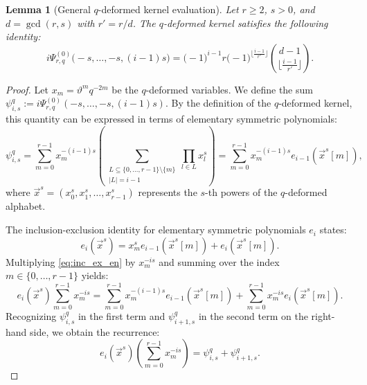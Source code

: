 \documentclass[reqno,11pt]{amsart}
\theoremstyle{plain}
\newtheorem{lemma}[theorem]{Lemma}
\theoremstyle{definition}
\theoremstyle{remark}
\numberwithin{equation}{section}
\renewcommand{\theta}{\vartheta}
\newcommand{\1}{\mathds{1}}
\newcommand{\2}{\frac{1}{2}}
\begin{document}
{				\begin{lemma}[General $q$-deformed kernel evaluation]\label{l:Aq4_q}
					{Let $r \geq 2$, $s > 0$, and $d = \gcd(r, s)$ with $r' = r/d$. The $q$-deformed kernel satisfies the following identity:
						\begin{equation}
							i \Psi^{(0)}_{r,q}\big(-s, \dots, -s, (i-1)s\big) = \big(-1\big)^{i-1} r \big(-1\big)^{\lfloor \frac{i-1}{r'} \rfloor} \binom{d-1}{\lfloor \frac{i-1}{r'} \rfloor}.
					\end{equation}}
				\end{lemma}
				\begin{proof}
					{Let $x_m = \theta^m q^{-2m}$ be the $q$-deformed  variables. We define the sum $\psi_{i,s}^q := i \Psi^{(0)}_{r,q}(-s, \dots, -s, (i-1)s)$. By the definition of the $q$-deformed kernel, this quantity can be expressed in terms of elementary symmetric polynomials:
						\begin{equation}
							\psi_{i,s}^q = \sum_{m=0}^{r-1} x_m^{-(i-1)s} \left( \sum_{\substack{L \subseteq \{0, \dots, r-1\} \setminus \{m\} \\ |L|=i-1}} \prod_{l \in L} x_l^s \right) = \sum_{m=0}^{r-1} x_m^{-(i-1)s} e_{i-1}(\vec{{x}}^s[m]),
						\end{equation}
						where $\vec{{x}}^s = (x_0^s, x_1^s, \dots, x_{r-1}^s)$ represents the $s$-th powers of the $q$-deformed alphabet.}
					
					{The inclusion-exclusion identity for elementary symmetric polynomials $e_i$ states:
						\begin{equation}\label{eq:inc_ex_en}
							e_i(\vec{{x}}^s) = x_m^s e_{i-1}(\vec{{x}}^s[m]) + e_i(\vec{{x}}^s[m]).
						\end{equation}
						Multiplying \eqref{eq:inc_ex_en} by $x_m^{-is}$ and summing over the index $m \in \{0, \dots, r-1\}$ yields:
						\begin{equation}
							e_i(\vec{{x}}^s) \sum_{m=0}^{r-1} x_m^{-is} = \sum_{m=0}^{r-1} x_m^{-(i-1)s} e_{i-1}(\vec{{x}}^s[m]) + \sum_{m=0}^{r-1} x_m^{-is} e_i(\vec{{x}}^s[m]).
						\end{equation}
						Recognizing $\psi_{i,s}^q$ in the first term and $\psi_{i+1,s}^q$ in the second term on the right-hand side, we obtain the recurrence:
						\begin{equation}\label{eq:rec_q_en}
							e_i(\vec{{x}}^s) \left( \sum_{m=0}^{r-1} x_m^{-is} \right) = \psi_{i,s}^q + \psi_{i+1,s}^q.
					\end{equation}}
					

\end{proof}}
\end{document}
